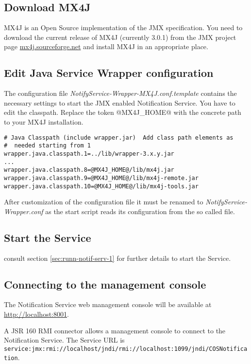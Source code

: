\subsection{Download MX4J}

MX4J is an Open Source implementation of the JMX specification. You need to download the current release of MX4J (currently 3.0.1) from the JMX project page \href{mx4j.sourceforge.net}{mx4j.sourceforge.net} and install MX4J in an appropriate place.

\subsection{Edit Java Service Wrapper configuration}

The configuration file \emph{NotifyService-Wrapper-MX4J.conf.template} contains the necessary settings to start the
JMX enabled Notification Service. You have to edit the classpath. Replace the token @MX4J\_HOME@ with the concrete path to your MX4J installation.

\begin{verbatim}
# Java Classpath (include wrapper.jar)  Add class path elements as
#  needed starting from 1
wrapper.java.classpath.1=../lib/wrapper-3.x.y.jar
...
wrapper.java.classpath.8=@MX4J_HOME@/lib/mx4j.jar
wrapper.java.classpath.9=@MX4J_HOME@/lib/mx4j-remote.jar
wrapper.java.classpath.10=@MX4J_HOME@/lib/mx4j-tools.jar
\end{verbatim}

After customization of the configuration file it must be renamed to \emph{NotifyService-Wrapper.conf} as the start script reads its configuration from the so called file. 

\subsection{Start the Service}
consult section \ref{sec:runn-notif-serv-1} for further details to start the Service.

\subsection{Connecting to the management console}

The Notification Service web management console will be available at
\href{http://localhost:8001}{http://localhost:8001}.

A JSR 160 RMI connector allows a management console to connect to the Notification Service. The Service URL is \texttt{service:jmx:rmi://localhost/jndi/rmi://localhost:1099/jndi/COSNotification}.

